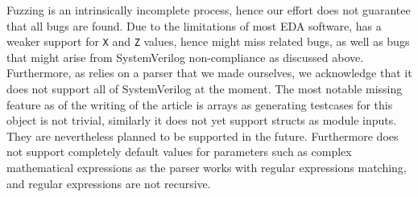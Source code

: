 


Fuzzing is an intrinsically incomplete process, hence our effort does not guarantee that all bugs are found.
Due to the limitations of most EDA software, \ourname has a weaker support for \texttt{X} and \texttt{Z} values, hence \ourname might miss related bugs,
as well as bugs that might arise from SystemVerilog non-compliance as discussed above.
Furthermore, as \ourname relies on a parser that we made ourselves, we acknowledge that it does not support all of SystemVerilog at the moment.
The most notable missing feature as of the writing of the article is arrays as generating testcases for this object is not trivial,
similarly it does not yet support structs as module inputs.
They are nevertheless planned to be supported in the future.
Furthermore \ourname does not support completely default values for parameters such as complex mathematical expressions
as the parser works with regular expressions matching, and regular expressions are not recursive.
\fls{\textcolor{cyan}{TODO JN: Explain what is missing in the parser.}}

